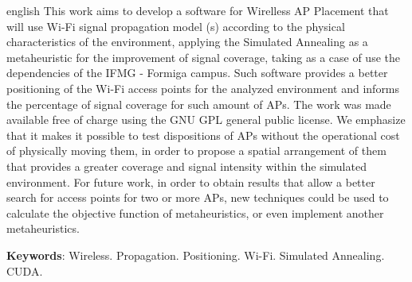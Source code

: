 \documentclass[
	12pt,				%
	twoside,			%
	a4paper,			%
	english,			%
	french,				%
	spanish,			%
	brazil				%
	]{abntex2}
\newcommand{\listofquadrosname}{Lista de quadros}
\begin{document}
\begin{resumo}[Abstract]
 \begin{otherlanguage*}{english}
   This work aims to develop a software for Wirelless AP Placement that
   will use Wi-Fi signal propagation model (s) according to the physical
   characteristics of the environment, applying the Simulated Annealing as
   a metaheuristic for the improvement of signal coverage, taking as a case
   of use the dependencies of the IFMG - Formiga campus. Such software
   provides a better positioning of the Wi-Fi access points for the
   analyzed environment and informs the percentage of signal coverage for
   such amount of APs. The work was made available free of charge using the
   GNU GPL general public license. We emphasize that it makes it possible
   to test dispositions of APs without the operational cost of physically
   moving them, in order to propose a spatial arrangement of them that
   provides a greater coverage and signal intensity within the simulated
   environment. For future work, in order to obtain results that allow a
   better search for access points for two or more APs, new techniques
   could be used to calculate the objective function of metaheuristics, or
   even implement another metaheuristics.

   \vspace{\onelineskip}
 
   \noindent 
   \textbf{Keywords}: Wireless. Propagation. Positioning. Wi-Fi. Simulated Annealing. CUDA.
 \end{otherlanguage*}
\end{resumo}



\listoffigures*
\cleardoublepage


\pdfbookmark[0]{\listofquadrosname}{loq}
\listofquadros*
\cleardoublepage

\listoftables*
\cleardoublepage
\end{document}

